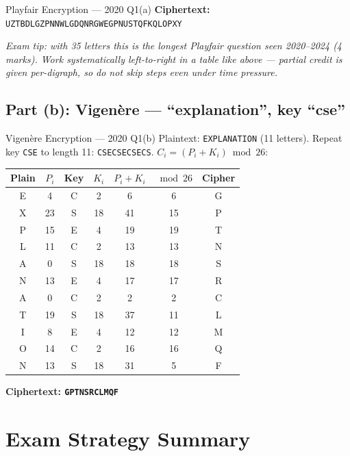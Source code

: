\documentclass[12pt,a4paper]{article}
\begin{document}
\begin{solbox}{Playfair Encryption --- 2020 Q1(a)}
\textbf{Ciphertext:} \texttt{UZTBDLGZPNNWLGDQNRGWEGPNUSTQFKQLOPXY}

\textit{Exam tip: with 35 letters this is the longest Playfair question seen 2020--2024 (4 marks). Work systematically left-to-right in a table like above --- partial credit is given per-digraph, so do not skip steps even under time pressure.}
\end{solbox}

\subsection{Part (b): Vigen\`ere --- ``explanation'', key ``cse''}
\begin{solbox}{Vigen\`ere Encryption --- 2020 Q1(b)}
Plaintext: \texttt{EXPLANATION} (11 letters). Repeat key \texttt{CSE} to length 11: \texttt{CSECSECSECS}.
$C_i=(P_i+K_i)\bmod 26$:

\begin{center}
\renewcommand{\arraystretch}{1.3}
\begin{tabular}{c|c|c|c|c|c|c}
\toprule
Plain & $P_i$ & Key & $K_i$ & $P_i+K_i$ & $\bmod 26$ & Cipher \\
\midrule
E & 4  & C & 2  & 6  & 6  & G \\
X & 23 & S & 18 & 41 & 15 & P \\
P & 15 & E & 4  & 19 & 19 & T \\
L & 11 & C & 2  & 13 & 13 & N \\
A & 0  & S & 18 & 18 & 18 & S \\
N & 13 & E & 4  & 17 & 17 & R \\
A & 0  & C & 2  & 2  & 2  & C \\
T & 19 & S & 18 & 37 & 11 & L \\
I & 8  & E & 4  & 12 & 12 & M \\
O & 14 & C & 2  & 16 & 16 & Q \\
N & 13 & S & 18 & 31 & 5  & F \\
\bottomrule
\end{tabular}
\end{center}

\textbf{Ciphertext: \texttt{GPTNSRCLMQF}}
\end{solbox}

\newpage
\section*{Exam Strategy Summary}
\end{document}
